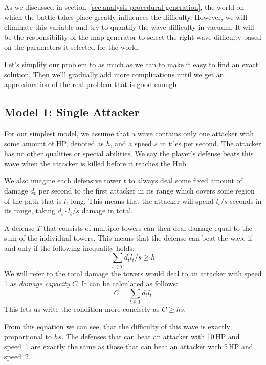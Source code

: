 As we discussed in section~\ref{sec:analysis-procedural-generation}, the world on which the battle takes place greatly influences the difficulty.
However, we will eliminate this variable and try to quantify the wave difficulty in vacuum.
It will be the responsibility of the map generator to select the right wave difficulty based on the parameters it selected for the world.

Let's simplify our problem to as much as we can to make it easy to find an exact solution.
Then we'll gradually add more complications until we get an approximation of the real problem that is good enough.

\subsection{Model 1: Single Attacker}\label{sec:analysis-waves-single}
For our simplest model, we assume that a wave contains only one attacker with some amount of HP, denoted as $h$, and a speed $s$ in tiles per second.
The attacker has no other qualities or special abilities.
We say the player's defense beats this wave when the attacker is killed before it reaches the Hub.

We also imagine each defensive tower $t$ to always deal some fixed amount of damage $d_t$ per second to the first attacker in its range which covers some region of the path that is $l_t$ long.
This means that the attacker will spend $l_t / s$ seconds in its range, taking $d_t \cdot l_t / s$ damage in total.

A defense $T$ that consists of multiple towers can then deal damage equal to the sum of the individual towers.
This means that the defense can beat the wave if and only if the following inequality holds:
\begin{equation}
    \sum_{t \in T} d_t l_t / s \geq h
\end{equation}
We will refer to the total damage the towers would deal to an attacker with speed 1 as \emph{damage capacity} $C$.
It can be calculated as follows:
\begin{equation}\label{eqn:C}
    C = \sum_{t \in T} d_t l_t
\end{equation}
This lets us write the condition more concisely as $C \geq hs$.

From this equation we can see, that the difficulty of this wave is exactly proportional to $hs$.
The defenses that can beat an attacker with 10\,HP and speed~1 are exactly the same as those that can beat an attacker with 5\,HP and speed~2.

